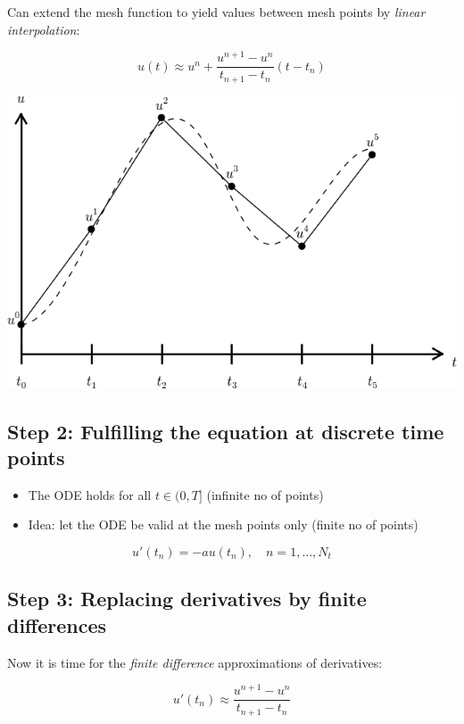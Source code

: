 \documentclass[%
oneside,                 %
final,                   %
10pt]{article}
\begin{document}
Can extend the mesh function to yield values between mesh points
by \emph{linear interpolation}:

\begin{equation}
u(t) \approx u^n + \frac{u^{n+1}-u^n}{t_{n+1}-t_n}(t - t_n)
\end{equation}



\centerline{\includegraphics[width=0.7\linewidth]{fig-alg/fdm_u_uei.png}}




\subsection*{Step 2: Fulfilling the equation at discrete time points}

\begin{itemize}
 \item The ODE holds for all $t\in (0,T]$ (infinite no of points)

 \item Idea: let the ODE be valid at the mesh points only (finite no of points)
\end{itemize}

\noindent
\begin{equation}
u'(t_n) = -au(t_n),\quad n=1,\ldots,N_t
\label{decay:step2}
\end{equation}


\subsection*{Step 3: Replacing derivatives by finite differences}

Now it is time for the \emph{finite difference} approximations of
derivatives:

\begin{equation}
u'(t_n) \approx \frac{u^{n+1}-u^{n}}{t_{n+1}-t_n}
\label{decay:FEdiff}
\end{equation}
\end{document}
